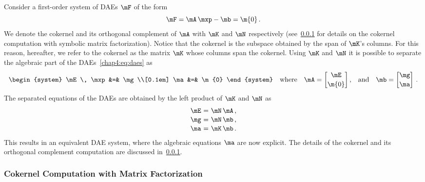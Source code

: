 Consider a first-order system of \acp{DAE} $\mF$ of the form
%
\begin{equation}
  \label{chap4:eq:daes}
  \mF = \mA \, \mxp - \mb = \m{0}  \, \text{.}
\end{equation}
%
We denote the cokernel and its orthogonal complement of $\mA$ with $\mK$ and $\mN$ respectively (see~\ref{chap4:sec:cokernel} for details on the cokernel computation with symbolic matrix factorization). Notice that the cokernel is the subspace obtained by the span of $\mK$'s columns. For this reason, hereafter, we refer to the cokernel as the matrix $\mK$ whose columns span the cokernel. Using $\mK$ and $\mN$ it is possible to separate the algebraic part of the \acp{DAE}~\eqref{chap4:eq:daes} as
%
\begin{equation}
  \label{chap4:eq:separated_daes}
  \begin{system}
    \mE \, \mxp &=& \mg \\[0.1em]
    \ma         &=& \m{0}
  \end{system} \quad \text{where} \quad \mA = \begin{bmatrix}
    \mE \\[0.2em]
    \m{0}
  \end{bmatrix} \text{,}
  \quad \text{and} \quad
  \mb = \begin{bmatrix}
     \mg \\[0.2em]
     \ma
  \end{bmatrix} \, \text{.}
\end{equation}
%
The separated equations of the \acp{DAE} are obtained by the left product of $\mK$ and $\mN$ as
%
\begin{equation*}
  \begin{array}{r@{~}c@{~}l}
    \mE &=& \mN \, \mA \, \text{,} \\[0.1em]
    \mg &=& \mN \, \mb \, \text{,} \\[0.1em]
    \ma &=& \mK \, \mb \, \text{.}
  \end{array}
\end{equation*}
%
This results in an equivalent \ac{DAE} system, where the algebraic equations $\ma$ are now explicit. The details of the cokernel and its orthogonal complement computation are discussed in~\ref{chap4:sec:cokernel}.


\subsubsection{Cokernel Computation with Matrix Factorization}
\label{chap4:sec:cokernel}


